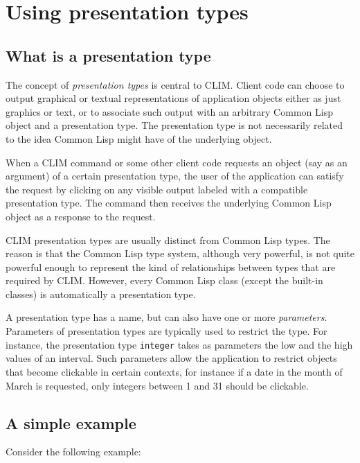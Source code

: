 \chapter{Using presentation types}

\section{What is a presentation type}

The concept of \emph{presentation types} is central to CLIM.  Client
code can choose to output graphical or textual representations of
application objects either as just graphics or text, or to associate
such output with an arbitrary Common Lisp object and a presentation
type.  The presentation type is not necessarily related to the idea
Common Lisp might have of the underlying object.

When a CLIM command or some other client code requests an object (say as
an argument) of a certain presentation type, the user of the application
can satisfy the request by clicking on any visible output labeled with a
compatible presentation type.  The command then receives the underlying
Common Lisp object as a response to the request.

CLIM presentation types are usually distinct from Common Lisp types.
The reason is that the Common Lisp type system, although very powerful,
is not quite powerful enough to represent the kind of relationships
between types that are required by CLIM.  However, every Common Lisp
class (except the built-in classes) is automatically a presentation
type.

A presentation type has a name, but can also have one or more
\emph{parameters}.  Parameters of presentation types are typically used
to restrict the type.  For instance, the presentation type \texttt{integer}
takes as parameters the low and the high values of an interval.  Such
parameters allow the application to restrict objects that become
clickable in certain contexts, for instance if a date in the month of
March is requested, only integers between 1 and 31 should be clickable.

\section{A simple example}

Consider the following example:



